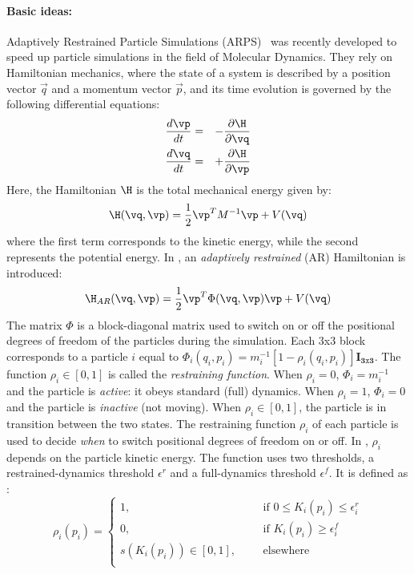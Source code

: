 \paragraph*{Basic ideas:}
Adaptively Restrained Particle Simulations (ARPS)~\cite{Artemova2012} was recently developed to speed up particle simulations in the field of Molecular Dynamics.
They rely on Hamiltonian mechanics, where the state of a system is described by a position vector $\vec q$ and a momentum vector $\vec p$, and its time evolution is governed by the following differential equations:
\begin{eqnarray*}
\frac{d\vp}{dt} &=& -\frac{\partial \H}{\partial \vq} \\
\frac{d\vq}{dt} &=& +\frac{\partial \H}{\partial \vp}
\end{eqnarray*}
Here, the Hamiltonian $\H$ is the total mechanical energy given by:
\begin{equation}
    \label{eq:hamiltonian}
    \H(\vq,\vp) = \frac{1}{2} \vp^{T}M^{-1}\vp + V(\vq)
\end{equation}
where the first term corresponds to the kinetic energy, while the second represents the potential energy.
In \cite{Artemova2012}, an \textit{adaptively restrained} (AR) Hamiltonian is introduced:
\begin{equation}
    \label{eq:arhamiltonian}
    \H_{AR}(\vq, \vp) = \frac{1}{2} \vp^{T}\Phi(\vq,\vp)\vp + V(\vq)
\end{equation}
The matrix $\Phi$ is a block-diagonal matrix used to switch on or off the positional degrees of freedom of the particles during the simulation.
Each $3$x$3$ block corresponds to a particle $i$ equal to
$\Phi_{i}(q_{i}, p_{i}) = m_{i}^{-1}[1 - \rho_{i}(q_{i}, p_{i})]\mathbf{I_{3\mathtt{x}3}}$.
The function $\rho_{i} \in [0, 1]$ is called the \emph{restraining function}.
When $\rho_{i} = 0$, $\Phi_{i} = m_{i}^{-1}$ and the particle is \textit{active}: it obeys standard (full) dynamics.
When $\rho_{i} = 1$, $\Phi_{i} = 0$ and the particle is \textit{inactive} (not moving). When $\rho_{i} \in [0, 1]$, the particle is in transition between the two states.
The restraining function $\rho_{i}$ of each particle is used to decide \emph{when} to switch positional degrees of freedom on or off.
In \cite{Artemova2012}, $\rho_{i}$ depends on the particle kinetic energy.
The function uses two thresholds, a restrained-dynamics threshold $\epsilon^{r}$ and a full-dynamics threshold $\epsilon^{f}$.
It is defined as :
\begin{equation}
    \label{eq:restrainingfunction}
    \rho_{i}(p_{i}) =
    \displaystyle\left\lbrace
    \begin{array}{lccc}
        1, & & & \textrm{if } 0 \leq K_{i}(p_{i}) \leq \epsilon_{i}^{r} \\
        0, & & & \textrm{if } K_{i}(p_{i}) \geq \epsilon_{i}^{f} \\
        s(K_{i}(p_{i})) \in [0, 1], & & & \textrm{elsewhere} \\
    \end{array}
    \right.
\end{equation}
